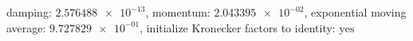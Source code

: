 damping: $\num[scientific-notation=true]{2.576488e-13}$, momentum: $\num[scientific-notation=true]{2.043395e-02}$, exponential moving average: $\num[scientific-notation=true]{9.727829e-01}$, initialize Kronecker factors to identity: $\text{yes}$